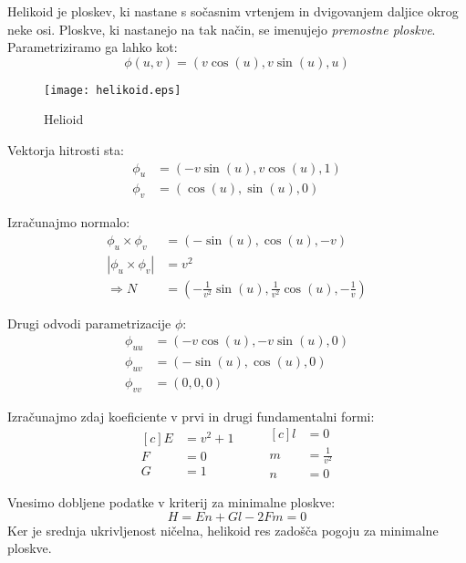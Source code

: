 \documentclass[mat1]{fmfdelo}
\begin{document}
\begin{primer}[Helikoid]
    Helikoid je ploskev, ki nastane s sočasnim vrtenjem in dvigovanjem daljice okrog neke osi.
    Ploskve, ki nastanejo na tak način, se imenujejo \emph{premostne ploskve}.
    Parametriziramo ga lahko kot:
    $$ \phi \left( u, v \right) = \left( v \cos \left( u\right), v \sin \left( u \right), u\right) $$

    \begin{figure}[h]
        \texttt{[image: helikoid.eps]}
        \caption{Helioid}
    \end{figure}

    Vektorja hitrosti sta:
    \begin{align*}
        \phi_u &= \left( - v \sin \left( u \right), v \cos \left( u \right), 1 \right) \\
        \phi_v &= \left( \cos \left( u \right), \sin \left( u \right), 0 \right)
    \end{align*}

    Izračunajmo normalo:
    \begin{align*}
        \phi_u \times \phi_v &= \left( - \sin(u), \cos(u), - v \right) \\
        \left\lvert \phi_u \times \phi_v \right\rvert &= v^2 \\
        \Rightarrow N &= \left( - \frac{1}{v^2} \sin(u), \frac{1}{v^2} \cos(u), - \frac{1}{v} \right)
    \end{align*}

    Drugi odvodi parametrizacije $\phi$:
    \begin{align*}
        \phi_{uu} &= \left( - v \cos(u), - v \sin(u), 0 \right) \\
        \phi_{uv} &= \left( - \sin(u), \cos(u), 0 \right) \\
        \phi_{vv} &= \left( 0, 0, 0 \right)
    \end{align*}

    Izračunajmo zdaj koeficiente v prvi in drugi fundamentalni formi:
    \begin{equation*}
        \begin{aligned}[c]
            E &= v^2 + 1 \\
            F &= 0 \\
            G &= 1
        \end{aligned}
        \qquad
        \begin{aligned}[c]
            l &= 0 \\
            m &= \frac{1}{v^2} \\
            n &= 0
        \end{aligned}
    \end{equation*}

    Vnesimo dobljene podatke v kriterij za minimalne ploskve:
    $$ H = En + Gl - 2Fm = 0 $$
    Ker je srednja ukrivljenost ničelna, helikoid res zadošča pogoju za minimalne ploskve.

\end{primer}
\end{document}
